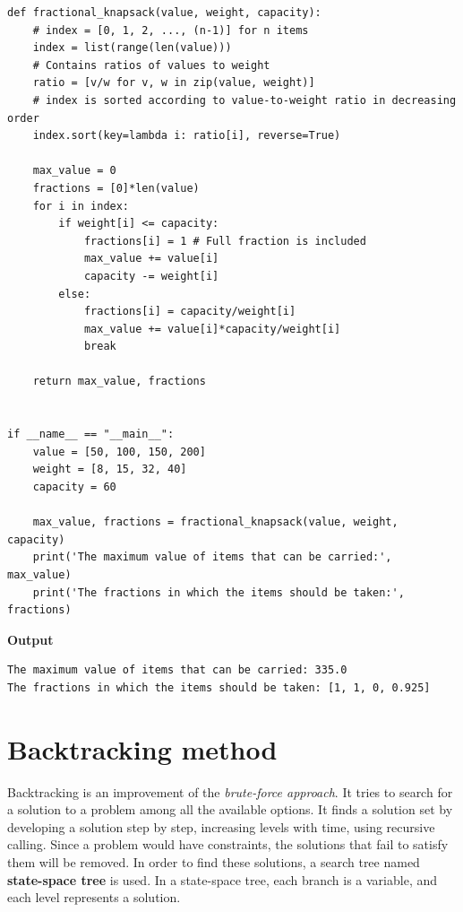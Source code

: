 \documentclass[a4paper,11pt]{book}
\begin{document}
\begin{lstlisting}
def fractional_knapsack(value, weight, capacity):
    # index = [0, 1, 2, ..., (n-1)] for n items
    index = list(range(len(value)))
    # Contains ratios of values to weight
    ratio = [v/w for v, w in zip(value, weight)]
    # index is sorted according to value-to-weight ratio in decreasing order
    index.sort(key=lambda i: ratio[i], reverse=True)
 
    max_value = 0
    fractions = [0]*len(value)
    for i in index:
        if weight[i] <= capacity:
            fractions[i] = 1 # Full fraction is included
            max_value += value[i]
            capacity -= weight[i]
        else:
            fractions[i] = capacity/weight[i]
            max_value += value[i]*capacity/weight[i]
            break
 
    return max_value, fractions
 
 
if __name__ == "__main__":
    value = [50, 100, 150, 200]
    weight = [8, 15, 32, 40]
    capacity = 60
    
    max_value, fractions = fractional_knapsack(value, weight, capacity)
    print('The maximum value of items that can be carried:', max_value)
    print('The fractions in which the items should be taken:', fractions)
\end{lstlisting}
\textbf{Output}
\begin{lstlisting}
The maximum value of items that can be carried: 335.0
The fractions in which the items should be taken: [1, 1, 0, 0.925]
\end{lstlisting}

\section{Backtracking method}

\noindent Backtracking is an improvement of the \textit{brute-force approach}. It tries to search for a solution to a problem among all the available options. It finds a solution set by developing a solution step by step, increasing levels with time, using recursive calling. Since a problem would have constraints, the solutions that fail to satisfy them will be removed. In order to find these solutions, a search tree named \textbf{state-space tree} is used. In a state-space tree, each branch is a variable, and each level represents a solution.
\vspace{4mm}
\end{document}
